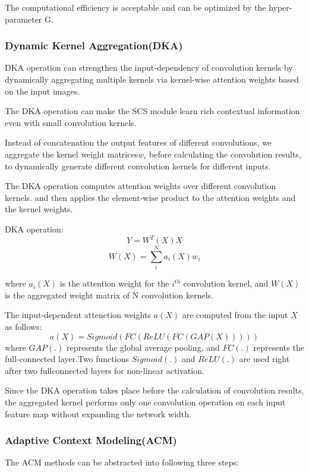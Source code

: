 \documentclass[11pt]{article}
\begin{document}
The computational efficiency is acceptable and can be optimized by the hyper-parameter G.

\subsubsection{Dynamic Kernel Aggregation(DKA)}
DKA operation can strengthen the input-dependency of convolution kernels by dynamically aggregating multiple kernels via kernel-wise attention weights based on the input images.

The DKA operation can make the SCS module learn rich contextual information even with small convolution kernels.

Instead of concatenation the output features of different convolutions, we aggregate the kernel weight matrices${w_i}$ before calculating the convolution results, to dynamically generate different convolution kernels for different inputs.

The DKA operation computes attention weights over different convolution kernels. and then applies the element-wise product to the attention weights and the kernel weights.

DKA operation:
$$Y = W^T(X)X$$
$$W(X) = \sum_{i}^{N}a_i(X)w_i$$

where $a_i(X)$ is the attention weight for the $i^{th}$ convolution kernel, and $W(X)$ is the aggregated weight matrix of N convolution kernels.

The input-dependent attenetion weights $a(X)$ are computed from the input $X$ as follows:
$$a(X) = Sigmoid(FC(ReLU(FC(GAP(X)))))$$
where $GAP(.)$ represents the global average pooling, and $FC(.)$ represents the full-connected layer.Two functions $Sigmoid(.)$ and $ReLU(.)$ are used right after two fullconnected layers for non-linear activation.

Since the DKA operation takes place before the calculation of convolution results, the aggregated kernel performs only one convolution operation on each input feature map without expanding the network width.

\subsubsection{Adaptive Context Modeling(ACM)}
The ACM methods can be abstracted into following three steps:
\end{document}
